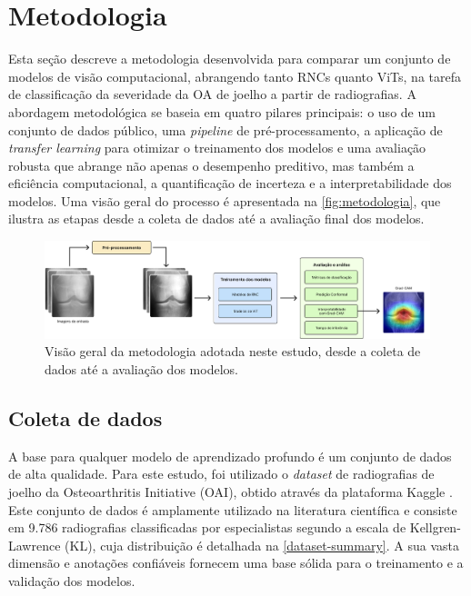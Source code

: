 \chapter{Metodologia}\label{cap:proposta}

Esta seção descreve a metodologia desenvolvida para comparar um conjunto de modelos de visão computacional, abrangendo tanto RNCs quanto ViTs, na tarefa de classificação da severidade da OA de joelho a partir de radiografias. A abordagem metodológica se baseia em quatro pilares principais: o uso de um conjunto de dados público, uma \textit{pipeline} de pré-processamento, a aplicação de \textit{transfer learning} para otimizar o treinamento dos modelos e uma avaliação robusta que abrange não apenas o desempenho preditivo, mas também a eficiência computacional, a quantificação de incerteza e a interpretabilidade dos modelos. Uma visão geral do processo é apresentada na \autoref{fig:metodologia}, que ilustra as etapas desde a coleta de dados até a avaliação final dos modelos.

\begin{figure}[ht]
    \centering
    \includegraphics[width=\linewidth]{figs/metodologia-pgc.png}
    \caption{Visão geral da metodologia adotada neste estudo, desde a coleta de dados até a avaliação dos modelos.}
    \label{fig:metodologia}
\end{figure}

\section{Coleta de dados}

A base para qualquer modelo de aprendizado profundo é um conjunto de dados de alta qualidade. Para este estudo, foi utilizado o \textit{dataset} de radiografias de joelho da Osteoarthritis Initiative (OAI), obtido através da plataforma Kaggle \cite{dataset-kaggle}. Este conjunto de dados é amplamente utilizado na literatura científica \cite{Tariq2023, Mohammed2023} e consiste em 9.786 radiografias classificadas por especialistas segundo a escala de Kellgren-Lawrence (KL), cuja distribuição é detalhada na \autoref{dataset-summary}. A sua vasta dimensão e anotações confiáveis fornecem uma base sólida para o treinamento e a validação dos modelos.

